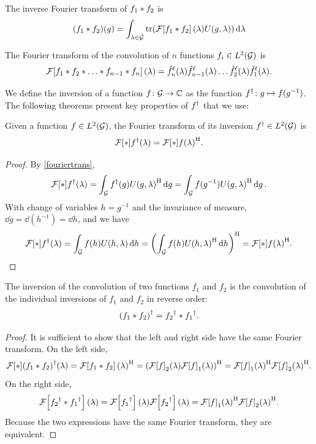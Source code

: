 \documentclass[../../main.tex]{subfiles}
\begin{document}
\begin{refsection}
	\begin{corollary}\label{convinvfourier}
		The inverse Fourier transform of $f_1 * f_2$ is
		$$(f_1 * f_2)(g) = \int_{\lambda \in \hat{\mathcal{G}}} \tr( \mathcal{F}\qty[f_1 * f_2](\lambda) U(g, \lambda) ) \dd{\lambda}$$
	\end{corollary}

	\begin{corollary}
		The Fourier transform of the convolution of $n$ functions $f_i \in L^2(\mathcal{G})$ is
		$$\mathcal{F}\qty[f_1 * f_2 * \ldots * f_{n-1} * f_n](\lambda) = \hat{f}^\ell_n(\lambda) \hat{f}^\ell_{n-1}(\lambda) \ldots \hat{f}^\ell_2(\lambda) \hat{f}^\ell_1(\lambda).$$
	\end{corollary}

	We define the inversion of a function $f \colon \mathcal{G} \to \mathbb{C}$ as the function ${f}^{\dagger} \colon g \mapsto f(g^{-1})$.
	The following theorems present key properties of ${f}^{\dagger}$ that we use:

	\begin{theorem}\label{inversion_fouriertrans}
		Given a function $f \in L^2(\mathcal{G})$, the Fourier transform of its inversion ${f}^{\dagger} \in L^2(\mathcal{G})$ is
		$$\mathcal{F}\qty[*]{{f}^{\dagger}}(\lambda) = {\mathcal{F}\qty[*]{f}(\lambda)}^\mathrm{H}.$$
	\end{theorem}
	\begin{proof}
		By \cref{fouriertrans},
		$$\mathcal{F}\qty[*]{{f}^{\dagger}}(\lambda) = \int_{\mathcal{G}} {f}^{\dagger}(g) {U(g, \lambda)}^\mathrm{H} \dd{g} = \int_{\mathcal{G}} f(g^{-1}) {U(g, \lambda)}^\mathrm{H} \dd{g}.$$
		With change of variables $h = g^{-1}$ and the invariance of measure, $\dd{g} = \dd(h^{-1}) = \dd{h}$, and we have
		$$\mathcal{F}\qty[*]{{f}^{\dagger}}(\lambda) = \int_{\mathcal{G}} f(h) U(h, \lambda) \dd{h} = {\qty(\int_{\mathcal{G}} f(h) {U(h, \lambda)}^\mathrm{H} \dd{h})}^\mathrm{H} = {\mathcal{F}\qty[*]{f}(\lambda)}^\mathrm{H}.$$
	\end{proof}

	\begin{theorem}\label{finversionisrevconv}
		The inversion of the convolution of two functions $f_1$ and $f_2$ is the convolution of the individual inversions of $f_1$ and $f_2$ in reverse order:
		$${(f_1 * f_2)}^{\dagger} = {f_2}^{\dagger} * {f_1}^{\dagger}.$$
	\end{theorem}
	\begin{proof}
		It is sufficient to show that the left and right side have the same Fourier transform.
		On the left side,
		$$\mathcal{F}\qty[*]{{(f_1 *f_2)}^{\dagger}}(\lambda) = {\mathcal{F}\qty[f_1 * f_2](\lambda)}^\mathrm{H} = {\qty(\mathcal{F}\qty[f]_2(\lambda) \mathcal{F}\qty[f]_1(\lambda))}^\mathrm{H} = {\mathcal{F}\qty[f]_1(\lambda)}^\mathrm{H} {\mathcal{F}\qty[f]_2(\lambda)}^\mathrm{H}.$$
		On the right side,
		$$\mathcal{F}\qty[{f_2}^{\dagger} * {f_1}^{\dagger}](\lambda) = \mathcal{F}\qty[{f_1}^{\dagger}](\lambda) \mathcal{F}\qty[{f_2}^{\dagger}](\lambda) = {\mathcal{F}\qty[f]_1(\lambda)}^\mathrm{H} {\mathcal{F}\qty[f]_2(\lambda)}^\mathrm{H}.$$
		Because the two expressions have the same Fourier transform, they are equivalent.
	\end{proof}


\end{refsection}
\end{document}
